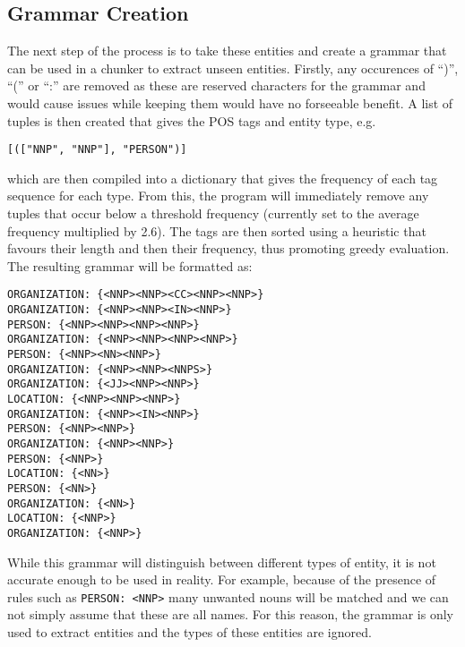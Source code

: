 \documentclass[draft]{article}
\begin{document}
\begin{multicols*}{2}
\section*{Grammar Creation}
The next step of the process is to take these entities and create a grammar that can be used in a chunker \citep{NLPChunker} to extract unseen entities. Firstly, any occurences of ``)'', ``('' or ``:'' are removed as these are reserved characters for the grammar and would cause issues while keeping them would have no forseeable benefit. A list of tuples is then created that gives the POS tags and entity type, e.g. \begin{verbatim}[(["NNP", "NNP"], "PERSON")]\end{verbatim} which are then compiled into a dictionary that gives the frequency of each tag sequence for each type. From this, the program will immediately remove any tuples that occur below a threshold frequency (currently set to the average frequency multiplied by 2.6). The tags are then sorted using a heuristic that favours their length and then their frequency, thus promoting greedy evaluation. The resulting grammar will be formatted as:
\begin{verbatim}
ORGANIZATION: {<NNP><NNP><CC><NNP><NNP>}
ORGANIZATION: {<NNP><NNP><IN><NNP>}
PERSON: {<NNP><NNP><NNP><NNP>}
ORGANIZATION: {<NNP><NNP><NNP><NNP>}
PERSON: {<NNP><NN><NNP>}
ORGANIZATION: {<NNP><NNP><NNPS>}
ORGANIZATION: {<JJ><NNP><NNP>}
LOCATION: {<NNP><NNP><NNP>}
ORGANIZATION: {<NNP><IN><NNP>}
PERSON: {<NNP><NNP>}
ORGANIZATION: {<NNP><NNP>}
PERSON: {<NNP>}
LOCATION: {<NN>}
PERSON: {<NN>}
ORGANIZATION: {<NN>}
LOCATION: {<NNP>}
ORGANIZATION: {<NNP>}
\end{verbatim}

While this grammar will distinguish between different types of entity, it is not accurate enough to be used in reality. For example, because of the presence of rules such as \texttt{PERSON: {<NNP>}} many unwanted nouns will be matched and we can not simply assume that these are all names. For this reason, the grammar is only used to extract entities and the types of these entities are ignored.


\end{multicols*}
\end{document}
